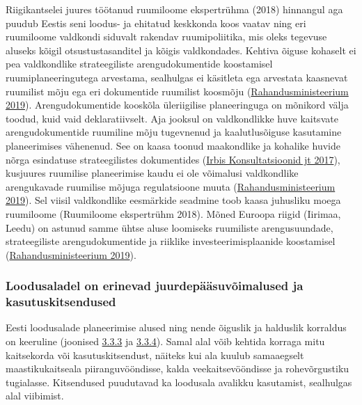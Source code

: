 \documentclass[estonian,]{article}
\begin{document}
Riigikantselei juures töötanud ruumiloome ekspertrühma (2018) hinnangul aga puudub Eestis seni loodus- ja ehitatud keskkonda koos vaatav ning eri ruumiloome valdkondi siduvalt rakendav ruumipoliitika, mis oleks tegevuse aluseks kõigil otsustustasanditel ja kõigis valdkondades. Kehtiva õiguse kohaselt ei pea valdkondlike strateegiliste arengudokumentide koostamisel ruumiplaneeringutega arvestama, sealhulgas ei käsitleta ega arvestata kaasnevat ruumilist mõju ega eri dokumentide ruumilist koosmõju (\protect\hyperlink{Rahandusministeerium2019}{Rahandusministeerium 2019}). Arengudokumentide kooskõla üleriigilise planeeringuga on mõnikord välja toodud, kuid vaid deklaratiivselt. Aja jooksul on valdkondlikke huve kaitsvate arengudokumentide ruumiline mõju tugevnenud ja kaalutlusõiguse kasutamine planeerimises vähenenud. See on kaasa toonud maakondlike ja kohalike huvide nõrga esindatuse strateegilistes dokumentides (\protect\hyperlink{Irbis2017}{Irbis Konsultatsioonid jt 2017}), kusjuures ruumilise planeerimise kaudu ei ole võimalusi valdkondlike arengukavade ruumilise mõjuga regulatsioone muuta (\protect\hyperlink{Rahandusministeerium2019}{Rahandusministeerium 2019}). Sel viisil valdkondlike eesmärkide seadmine toob kaasa juhusliku moega ruumiloome (Ruumiloome ekspertrühm 2018). Mõned Euroopa riigid (Iirimaa, Leedu) on astunud samme ühtse aluse loomiseks ruumiliste arengusuundade, strateegiliste arengudokumentide ja riiklike investeerimisplaanide koostamisel (\protect\hyperlink{Rahandusministeerium2019}{Rahandusministeerium 2019}).

\hypertarget{loodusaladel-on-erinevad-juurdepuxe4uxe4suvuxf5imalused-ja-kasutuskitsendused}{%
\subsubsection*{Loodusaladel on erinevad juurdepääsuvõimalused ja kasutuskitsendused}\label{loodusaladel-on-erinevad-juurdepuxe4uxe4suvuxf5imalused-ja-kasutuskitsendused}}

Eesti loodusalade planeerimise alused ning nende õiguslik ja halduslik korraldus on keeruline (joonised \protect\hyperlink{figure333}{3.3.3} ja \protect\hyperlink{figure334}{3.3.4}). Samal alal võib kehtida korraga mitu kaitsekorda või kasutuskitsendust, näiteks kui ala kuulub samaaegselt maastikukaitseala piiranguvööndisse, kalda veekaitsevööndisse ja rohevõrgustiku tugialasse. Kitsendused puudutavad ka loodusala avalikku kasutamist, sealhulgas alal viibimist.
\end{document}
